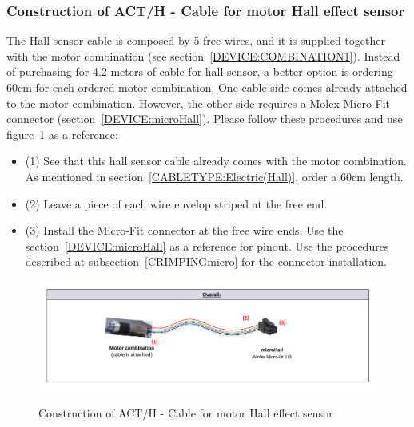 \subsubsection{Construction of ACT/H - Cable for motor Hall effect sensor} \label{CONSTRUCTION:ACTH}
The Hall sensor cable is composed by 5 free wires, and it is supplied together with the motor combination (see section~\ref{DEVICE:COMBINATION1}). Instead of purchasing for 4.2 meters of cable for hall sensor, a better option is ordering 60cm for each ordered motor combination. One cable side comes already attached to the motor combination. However, the other side requires a Molex Micro-Fit connector (section~\ref{DEVICE:microHall}). Please follow these procedures and use figure~\ref{FIG:ACTHconstruction} as a reference:
\begin{itemize}
  \item (1) See that this hall sensor cable already comes with the motor combination. As mentioned in section~\ref{CABLETYPE:Electric(Hall)}, order a 60cm length.
  \item (2) Leave a piece of each wire envelop striped at the free end.
  \item (3) Install the Micro-Fit connector at the free wire ends. Use the section~\ref{DEVICE:microHall} as a reference for pinout. Use the procedures described at subsection~\ref{CRIMPINGmicro} for the connector installation.
\end{itemize}
\begin{figure}
  \centering
  \includegraphics[angle=90,width=1\columnwidth]{figs/body03/FIGACTHconstruction.pdf}\\
  \caption[Construction of ACT/H - Cable for motor Hall effect sensor]{Construction of ACT/H - Cable for motor Hall effect sensor}
  \label{FIG:ACTHconstruction}
\end{figure}

